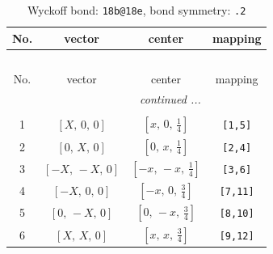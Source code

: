 \documentclass[fleqn,8pt]{jsarticle}
\begin{document}
\begin{longtable}{cccc}
\caption{Wyckoff bond: {\tt 18b@18e}, bond symmetry: {\tt .2}}
 \\
 \hline \hline
No. & vector & center & mapping \\ \hline \endfirsthead

\multicolumn{3}{l}{\tablename\ \thetable{}} \\
 \hline \hline
No. & vector & center & mapping \\ \hline \endhead

 \hline \hline
\multicolumn{3}{r}{\footnotesize\it continued ...} \\ \endfoot

 \hline \hline
\multicolumn{3}{r}{} \\ \endlastfoot

1 & $\left[ X,\, 0,\, 0 \right]$ & $\left[ x,\, 0,\, \frac{1}{4} \right]$ & {\tt [1,5]} \\ \hline
2 & $\left[ 0,\, X,\, 0 \right]$ & $\left[ 0,\, x,\, \frac{1}{4} \right]$ & {\tt [2,4]} \\ \hline
3 & $\left[ - X,\, - X,\, 0 \right]$ & $\left[ - x,\, - x,\, \frac{1}{4} \right]$ & {\tt [3,6]} \\ \hline
4 & $\left[ - X,\, 0,\, 0 \right]$ & $\left[ - x,\, 0,\, \frac{3}{4} \right]$ & {\tt [7,11]} \\ \hline
5 & $\left[ 0,\, - X,\, 0 \right]$ & $\left[ 0,\, - x,\, \frac{3}{4} \right]$ & {\tt [8,10]} \\ \hline
6 & $\left[ X,\, X,\, 0 \right]$ & $\left[ x,\, x,\, \frac{3}{4} \right]$ & {\tt [9,12]} \\
\end{longtable}
\renewcommand{\arraystretch}{1.2}
\end{document}
